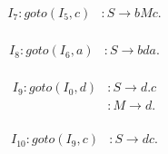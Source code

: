 \documentclass{article}
\begin{document}
\begin{multicols}{2}
\begin{equation*}
\begin{aligned}
I_7 : goto(I_5,c) &: S \rightarrow bMc.  \\
\end{aligned}
\end{equation*}

\begin{equation*}
\begin{aligned}
I_8 : goto(I_6,a) &: S \rightarrow bda.  \\
\end{aligned}
\end{equation*}

\begin{equation*}
\begin{aligned}
I_9 : goto(I_0,d) &: S \rightarrow d.c  \\
&: M \rightarrow d.  \\
\end{aligned}
\end{equation*}


\begin{equation*}
\begin{aligned}
I_{10} : goto(I_9,c) &: S \rightarrow dc.  \\
\end{aligned}
\end{equation*}
\end{multicols}
\end{document}
